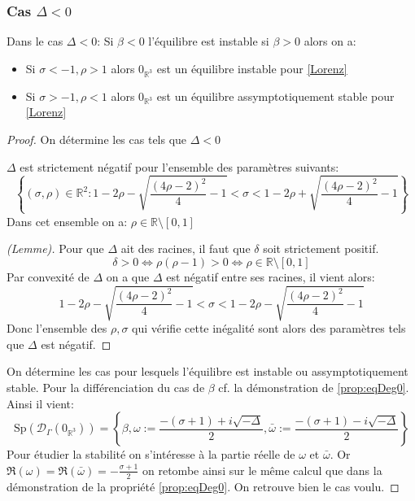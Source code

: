 \documentclass{article}
\newcommand{\R}{\mathbb{R}}
\newtheorem[M , nocut]{prop}{Proposition}[section]
\newtheorem[M , nocut]{definition}{Définition}
\newtheorem[M , nocut]{lemme}{Lemme}
\newtheorem[L , nocut]{thm}{Théoreme}
\newtheorem[M , nocut]{cor}{Corollaire}
\begin{document}
\subsubsection*{Cas $\Delta < 0$}

\begin{prop}
    \label{prop:eqDinf0}
    Dans le cas $\Delta<0$:
    Si $\beta <0$ l'équilibre est instable si $\beta>0$ alors on a:
    \begin{itemize}
        \item Si $\sigma < -1 , \rho > 1$ alors $0_{\R^3}$ est un équilibre instable pour \eqref{Lorenz}
        \item Si $\sigma > -1 , \rho < 1$ alors $0_{\R^3}$ est un équilibre assymptotiquement stable pour \eqref{Lorenz}
    \end{itemize}
\end{prop}
\begin{proof}
    On détermine les cas tels que $\Delta<0$
    \begin{lemme}
        $\Delta$ est strictement négatif pour l'ensemble des paramètres suivants:
        \[
        \left\{(\sigma,\rho)\in \R ^2 : 1-2 \rho - \sqrt{ \frac{(4\rho-2)^2}{4} -1 }< \sigma < 1-2 \rho + \sqrt{ \frac{(4\rho-2)^2}{4} -1 } \right\}    
        \]Dans cet ensemble on a: $\rho \in \R \setminus [0,1]$ 
    \end{lemme}

    \begin{proof}[(Lemme)]
     Pour que $\Delta$ ait des racines, il faut que $\delta$ soit strictement positif.
    \[
    \delta > 0 \Leftrightarrow \rho(\rho-1) > 0 \Leftrightarrow \rho \in \R \setminus [0,1]
    \]Par convexité de $\Delta$ on a que $\Delta$ est négatif entre ses racines, il vient alors:
    \[
        1-2 \rho - \sqrt{ \frac{(4\rho-2)^2}{4} -1 } < \sigma < 1-2 \rho - \sqrt{ \frac{(4\rho-2)^2}{4} -1 }
    \]Donc l'ensemble des $\rho,\sigma$ qui vérifie cette inégalité sont alors des paramètres tels que $\Delta$ est négatif.
    \end{proof}

    On détermine les cas pour lesquels l'équilibre est instable ou assymptotiquement stable. Pour la différenciation du cas de $\beta$ cf. la démonstration de \ref{prop:eqDeg0}. Ainsi il vient:
    \[
        \mathrm{Sp}(\mathcal{D}_\Gamma (0_{\R^3})) = \left\{\beta, \omega := \frac{-(\sigma+1)+ i \sqrt{-\Delta}}{2}, \bar{\omega} := \frac{-(\sigma+1)- i \sqrt{-\Delta}}{2}\right\}
    \]Pour étudier la stabilité on s'intéresse à la partie réelle de $\omega$ et $\bar{\omega}$. Or $\Re (\omega) = \Re (\bar{\omega}) = -\frac{\sigma+1}{2}$ on retombe ainsi sur le même calcul que dans la démonstration de la propriété \ref{prop:eqDeg0}. On retrouve bien le cas voulu.
\end{proof}
\end{document}
